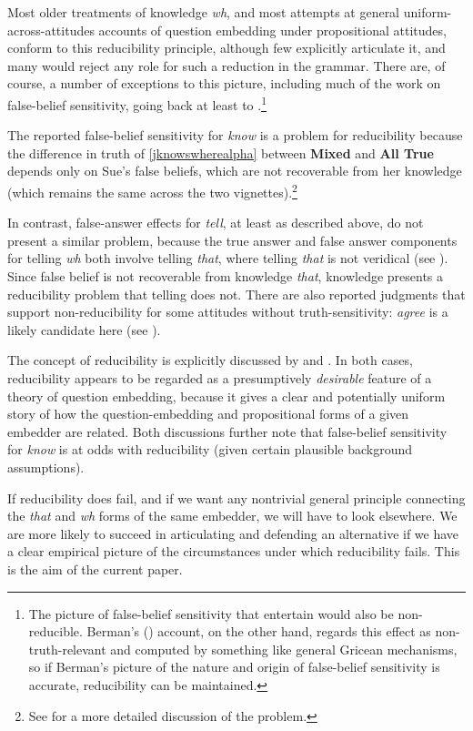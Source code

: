 \documentclass[a4paper]{article}
\begin{document}
Most older treatments of knowledge \textit{wh}, and most attempts at general uniform-across-attitudes accounts of question embedding under propositional attitudes, conform to this reducibility principle, although few explicitly articulate it, and many would reject any role for such a reduction in the grammar. There are, of course, a number of exceptions to this picture, including much of the work on false-belief sensitivity, going back at least to \citet{spector:05}.\footnote{The picture of false-belief sensitivity that \citet{gs:82} entertain would also be non-reducible. Berman's (\citeyear{berman}) account, on the other hand, regards this effect as non-truth-relevant and computed by something like general Gricean mechanisms, so if Berman's picture of the nature and origin of false-belief sensitivity is accurate, reducibility can be maintained.}

The reported false-belief sensitivity for \textit{know} is a problem for reducibility because the difference in truth of \ref{jknowswherealpha} between \textbf{Mixed} and \textbf{All True} depends only on Sue's false beliefs, which are not recoverable from her knowledge (which remains the same across the two vignettes).\footnote{See \citet{george:dis,george:thought} for a more detailed discussion of the problem.} 

In contrast, false-answer effects for \emph{tell}, at least as described above, do not present a similar problem, because the true answer and false answer components for telling \textit{wh} both involve telling \textit{that}, where telling \textit{that} is not veridical (see \citet{kr:11}). Since false belief is not recoverable from knowledge \textit{that}, knowledge presents a reducibility problem that telling does not. There are also reported judgments that support non-reducibility for some attitudes without truth-sensitivity: \textit{agree} is a likely candidate here (see \citet{cg:15}).

The concept of reducibility is explicitly discussed by \citet{kr:11} and \citet{george:dis}. In both cases, reducibility appears to be regarded as a presumptively \emph{desirable} feature of a theory of question embedding, because it gives a clear and potentially uniform story of how the question-embedding and propositional forms of a given embedder are related. Both discussions further note that false-belief sensitivity for \textit{know} is at odds with reducibility (given certain plausible background assumptions).

If reducibility does fail, and if we want any nontrivial general principle connecting the \textit{that} and \textit{wh} forms of the same embedder, we will have to look elsewhere. We are more likely to succeed in articulating and defending an alternative if we have a clear empirical picture of the circumstances under which reducibility fails. This is the aim of the current paper. 
\end{document}
